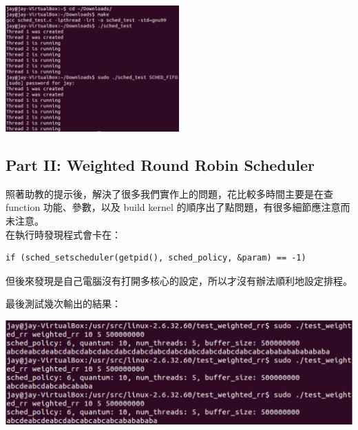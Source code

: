 \documentclass{article}
\begin{document}
\begin{center}
    \includegraphics[width=0.5\textwidth]{img/sched_fifo.png}
\end{center}

\newpage
\subsection*{Part II: Weighted Round Robin Scheduler}

照著助教的提示後，解決了很多我們實作上的問題，花比較多時間主要是在查 function 功能、參數，以及 build kernel 的順序出了點問題，有很多細節應注意而未注意。\\

在執行時發現程式會卡在：

\begin{lstlisting}
if (sched_setscheduler(getpid(), sched_policy, &param) == -1)
\end{lstlisting}

但後來發現是自己電腦沒有打開多核心的設定，所以才沒有辦法順利地設定排程。

最後測試幾次輸出的結果：

\begin{center}
\includegraphics[width=1\textwidth]{img/sched_weighted_rr.png}
\end{center}
\end{document}
